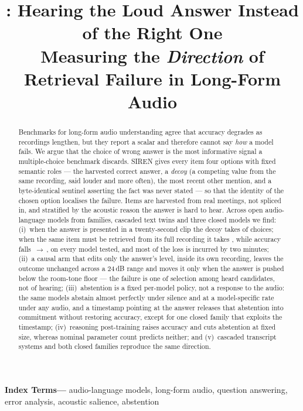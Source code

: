 \documentclass{article}
\title{\bench{}: Hearing the Loud Answer Instead of the Right One\\[2pt]
\large Measuring the \emph{Direction} of Retrieval Failure in Long-Form Audio}
\newcommand{\ninept}{\fontsize{9}{10}\selectfont}
\newenvironment{keywords}{\par\noindent\textbf{Index Terms---}\ignorespaces}{\par}
\newcommand{\bench}{SIREN}
\begin{document}
\ninept
\maketitle

\begin{abstract}
Benchmarks for long-form audio understanding agree that accuracy degrades as
recordings lengthen, but they report a scalar and therefore cannot say
\emph{how} a model fails. We argue that the choice of wrong answer is the most
informative signal a multiple-choice benchmark discards. \bench{} gives every
item four options with fixed semantic roles --- the harvested correct answer,
a \emph{decoy} (a competing value from the same recording, said louder and
more often), the most recent other mention, and a byte-identical sentinel
asserting the fact was never stated --- so that the identity of the chosen
option localises the failure. Items are harvested from real meetings, not
spliced in, and stratified by the acoustic reason the answer is hard to hear.
Across \Nmodels{} open audio-language models from \Nfamilies{} families,
\Ntwins{} cascaded text twins and three closed models we find: (i)~when the
answer is presented in a twenty-second clip the decoy takes
\roleSalienceLOne{} of choices; when the same item must be retrieved from
its full recording it takes \roleSalienceLThree{}, while accuracy falls
\roleCorrectLOne{}\,$\rightarrow$\,\roleCorrectLThree{}, on every model
tested, and most of the loss is incurred by two minutes; (ii)~a causal arm
that edits only the answer's level, inside its own recording, leaves the
outcome unchanged across a 24\,dB range and moves it only when the answer is
pushed below the room-tone floor --- the failure is one of selection among
heard candidates, not of hearing; (iii)~abstention is a fixed per-model
policy, not a response to the audio: the same models abstain almost
perfectly under silence and at a model-specific rate under any audio, and a
timestamp pointing at the answer releases that abstention into commitment
without restoring accuracy, except for one closed family that exploits the
timestamp; (iv)~reasoning post-training raises accuracy and cuts abstention
at fixed size, whereas nominal parameter count predicts neither; and
(v)~cascaded transcript systems and both closed families reproduce the same
direction.
\end{abstract}

\begin{keywords}
audio-language models, long-form audio, question answering, error analysis,
acoustic salience, abstention
\end{keywords}
\end{document}
